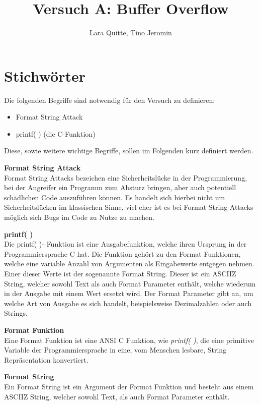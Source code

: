 \documentclass[12pt,a4paper]{article}
\date{}
\author{Lara Quitte, Tino Jeromin}
\title{Versuch A: Buffer Overflow}
\begin{document}
	\maketitle
	
	
	\section*{Stichwörter}
	Die folgenden Begriffe sind notwendig für den Versuch zu definieren:
	\begin{itemize}
		\item Format String Attack
		\item printf( ) (die C-Funktion)
	\end{itemize}
	
	Diese, sowie weitere wichtige Begriffe, sollen im Folgenden kurz definiert werden.
	\bigskip
	
	\textbf{Format String Attack} \\
	Format String Attacks bezeichen eine Sicherheitslücke in der Programmierung, bei der Angreifer ein Programm zum Absturz bringen, aber auch potentiell schädlichen Code auszuführen können.
	Es handelt sich hierbei nicht um Sicherheitslücken im klassischen Sinne, viel eher ist es bei Format String Attacks möglich sich Bugs im Code zu Nutze zu machen.
	\bigskip
	
	\textbf{printf( )} \\
	Die printf( )- Funktion ist eine Ausgabefunktion, welche ihren Ursprung in der Programmiersprache C hat. Die Funktion gehört zu den Format Funktionen, welche  eine variable Anzahl von Argumenten als Eingabewerte entgegen nehmen. Einer dieser Werte ist der sogenannte Format String. Dieser ist ein ASCIIZ String, welcher sowohl Text als auch Format Parameter enthält, welche wiederum in der Ausgabe mit einem Wert ersetzt wird. Der Format Parameter gibt an, um welche Art von Ausgabe es sich handelt, beispielsweise Dezimalzahlen oder auch Strings.
	\bigskip
	
	\textbf{Format Funktion} \\
	Eine Format Funktion ist eine ANSI C Funktion, wie \textit{printf( )}, die eine primitive Variable der Programmiersprache in eine, vom Menschen lesbare, String Repräsentation konvertiert.
	\bigskip
	
	\textbf{Format String} \\
	Ein Format String ist ein Argument der Format Funktion und besteht aus einem ASCIIZ String, welcher sowohl Text, als auch Format Parameter enthält.
	\bigskip
	
\end{document}
